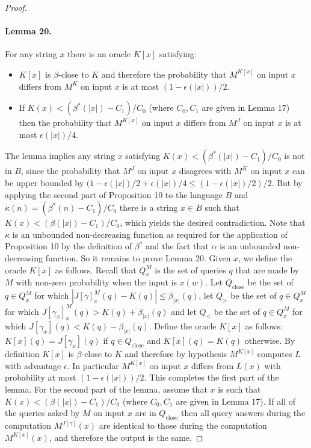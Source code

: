 \documentclass[10pt,a4paper]{article}
\begin{document}
\begin{proof}
\paragraph{Lemma 20.}
For any string $x$ there is an oracle $K[x]$ satisfying:
\begin{itemize}
\item $K[x]$ is $\beta$-close to $K$ and therefore the probability that $M^{K[x]}$ on input $x$ differs from $M^K$ on input $x$ is at most $(1-\epsilon(|x|))/2$.
\item If $K(x)<(\beta^*(|x|)-C_1)/C_0$ (where $C_0,C_1$ are given in Lemma 17) then the probability that $M^{K[x]}$ on input $x$ differs from $M^J$ on input $x$ is at most $\epsilon(|x|)/4$.
\end{itemize}
The lemma implies any string $x$ satisfying $K(x)<(\beta^*(|x|)-C_1)/C_0$ is not in $B$, since the probability that $M^J$ on input $x$ disagrees with $M^K$ on input $x$ can be upper bounded by $(1-\epsilon(|x|)/2+\epsilon(|x|)/4\leq(1-\epsilon(|x|)/2)/2$. But by applying the second part of Proposition 10 to the language $B$ and $\kappa(n)=(\beta^*(n)-C_1)/C_0$ there is a string $x\in B$ such that $K(x)<(\beta(|x|)-C_1)/C_0$, which yields the desired contradiction. Note that $\kappa$ is an unbounded non-decreasing function as required for the application of Proposition 10 by the definition of $\beta^*$ and the fact that $\alpha$ is an unbounded non-decreasing function.
So it remains to prove Lemma 20. Given $x$, we define the oracle $K[x]$ as follows. Recall that $Q_x^M$ is the set of queries $q$ that are made by $M$ with non-zero probability when the input is $x(w)$. Let $Q_{\mathrm{close}}$ be the set of $q\in Q_x^M$ for which $|J[\gamma]_x^M(q)-K(q)|\leq\beta_{|x|}(q)$, let $Q_>$ be the set of $q\in Q_x^M$ for which $J[\gamma_x]_x^M(q)>K(q)+\beta_{|x|}(q)$ and let $Q_<$ be the set of $q\in Q_x^M$ for which $J[\gamma_x](q)<K(q)-\beta_{|x|}(q)$. Define the oracle $K[x]$ as follows: $K[x](q)=J[\gamma_x](q)$ if $q\in Q_{\mathrm{close}}$ and $K[x](q)=K(q)$ otherwise.
By definition $K[x]$ is $\beta$-close to $K$ and therefore by hypothesis $M^{K[x]}$ computes $L$ with advantage $\epsilon$. In particular $M^{K[x]}$ on input $x$ differs from $L(x)$ with probability at most $(1-\epsilon(|x|))/2$. This completes the first part of the lemma.
For the second part of the lemma, assume that $x$ is such that $K(x)<(\beta(|x|)-C_1)/C_0$ (where $C_0,C_1$ are given in Lemma 17).
If all of the queries asked by $M$ on input $x$ are in $Q_{\mathrm{close}}$ then all query answers during the computation $M^{J[\gamma]}(x)$ are identical to those during the computation $M^{K[x]}(x)$, and therefore the output is the same.

\end{proof}
\end{document}
